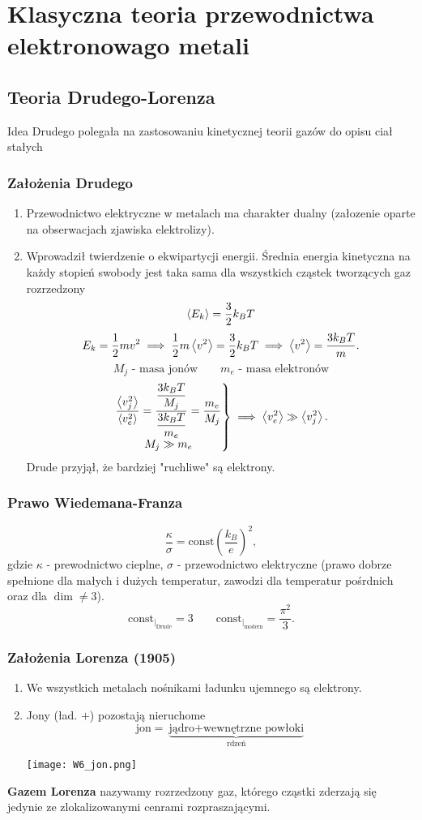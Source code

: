 \section{Klasyczna teoria przewodnictwa elektronowago metali}
\subsection{Teoria Drudego-Lorenza}
Idea Drudego polegała na zastosowaniu kinetycznej teorii gazów do opisu ciał stałych
\subsubsection{Założenia Drudego}
\begin{enumerate}
\item Przewodnictwo elektryczne w metalach ma charakter dualny 
(załozenie oparte na obserwacjach zjawiska elektrolizy). 
\item Wprowadził twierdzenie o ekwipartycji energii. Średnia energia kinetyczna na 
każdy stopień swobody jest taka sama dla wszystkich cząstek tworzących gaz 
rozrzedzony
$$ \left< E_k \right> = \dfrac{3}{2} k_B T $$
$$ E_k = \dfrac{1}{2}mv^2 \implies \dfrac{1}{2}m \left< v^2 \right> = \dfrac{3}{2}k_B T
\implies \left< v^2 \right> = \dfrac{3 k_B T}{m}.$$
$$M_j  \mbox{ - masa jonów} \qquad m_e \mbox{ - masa elektronów}$$
$$	\left. \begin{matrix} \dfrac{\left< v_j^2 \right>}{\left< v_e^2 \right>}= 
\dfrac{\dfrac{3k_BT}{M_j}}{\dfrac{3k_BT}{m_e}} = \dfrac{m_e}{M_j} \\
M_j \gg m_e \end{matrix} \right\} \implies \left< v_e^2 \right> \gg \left< v_j^2 \right>.$$
Drude przyjął, że bardziej "ruchliwe" są elektrony.
\end{enumerate}
\subsubsection{Prawo Wiedemana-Franza}
$$ \dfrac{\kappa}{\sigma} = \mbox{const} \left( \dfrac{k_B}{e} \right)^2,$$
gdzie $\kappa$ - prewodnictwo cieplne, $\sigma$ - przewodnictwo elektryczne 
(prawo dobrze spełnione dla małych i dużych temperatur, zawodzi dla temperatur 
pośrdnich oraz dla $\dim \neq 3$).
$$ \mbox{const}_{\Big|_{\mbox{Drude}}} = 3 \qquad \mbox{const}_{\Big|_{
\mbox{modern}}} = \dfrac{\pi^2}{3}.$$
\subsubsection{Założenia Lorenza (1905)}
\begin{enumerate}
\item We wszystkich metalach nośnikami ładunku ujemnego są elektrony.
\item Jony (ład. $+$) pozostają nieruchome
$$ \mbox{jon}= \underbrace{\mbox{jądro}+
\mbox{wewnętrzne powłoki}}_{\mbox{rdzeń}}$$
\begin{center} \texttt{[image: W6\_jon.png]} \end{center}
\end{enumerate}
\textbf{Gazem Lorenza} nazywamy rozrzedzony gaz, którego cząstki zderzają się 
jedynie ze zlokalizowanymi cenrami rozpraszającymi.
